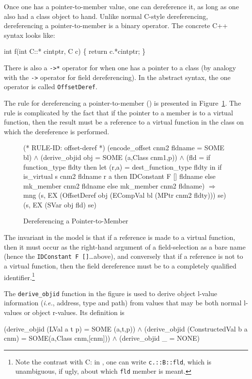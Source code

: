 \documentclass[11pt]{article}
\newcommand{\ie}{\emph{i.e.}}
\begin{document}
Once one has a pointer-to-member value, one can dereference it, as
long as one also had a class object to hand.  Unlike normal C-style
dereferencing, dereferencing a pointer-to-member is a binary
operator.  The concrete C++ syntax looks like:
\begin{stdrule}
   int f(int C::* cintptr, C c)
   \{
     return c.*cintptr;
   \}
\end{stdrule}
There is also a \texttt{->*} operator for when one has a pointer to a
class (by analogy with the \texttt{->} operator for field
dereferencing).  In the abstract syntax, the one operator is called
\texttt{OffsetDeref}.

The rule for dereferencing a pointer-to-member ()
is presented in Figure~\ref{fig:offset-deref}.  The rule is
complicated by the fact that if the pointer to a member is to a
virtual function, then the result must be a reference to a virtual
function in the class on which the dereference is performed.
\begin{figure}[hbtp]
%
\begin{stdrule}
(* RULE-ID: offset-deref *)
     (encode_offset cnm2 fldname = SOME bl) \(\land\)
     (derive_objid obj = SOME (a,Class cnm1,p)) \(\land\)
     (fld = if function_type fldty then
              let (r,a) = dest_function_type fldty
              in
                if is_virtual s cnm2 fldname r a then
                  IDConstant F [] fldname
                else
                  mk_member cnm2 fldname
            else
              mk_member cnm2 fldname)
   \(\Rightarrow\)
     mng (s, EX (OffsetDeref obj
                  (ECompVal bl (MPtr cnm2 fldty)))
                se)
         (s, EX (SVar obj fld) se)
\end{stdrule}
\caption{Dereferencing a Pointer-to-Member}
\label{fig:offset-deref}
\end{figure}
The invariant in the model is that if a reference is made to a virtual
function, then it must occur as the right-hand argument of a
field-selection as a bare name (hence the
\texttt{IDConstant~F~[]}\dots above), and conversely that if a
reference is not to a virtual function, then the field dereference
must be to a completely qualified identifier.\footnote{Note the
  contrast with C: in \cpp, one can write \texttt{c.::B::fld}, which
  is unambiguous, if ugly, about which \texttt{fld} member is meant.}

The \texttt{derive_objid}
function in the figure is used to derive object l-value information
(\ie, address, type and path) from values that may be both normal
l-values or object r-values.  Its definition is
\begin{stdrule}
   (derive_objid (LVal a t p) = SOME (a,t,p)) \(\land\)
   (derive_objid (ConstructedVal b a cnm) =
         SOME(a,Class cnm,[cnm])) \(\land\)
   (derive_objid _ = NONE)
\end{stdrule}
\end{document}
